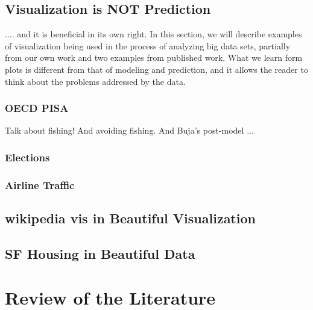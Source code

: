 \documentclass{article}
\begin{document}
\subsection{Visualization is NOT Prediction}

.... and it is beneficial in its own right. In this section, we will describe examples of visualization being used in the process of analyzing big data sets, partially from our own work and two examples from published work. What we learn form plots is different from that of modeling and prediction, and it allows the reader to think about the problems addressed by the data. 

\subsubsection{OECD PISA}

Talk about fishing! And avoiding fishing. And Buja's post-model ...

\subsubsection{Elections}

\subsubsection{Airline Traffic}

\subsection{wikipedia vis in Beautiful Visualization }

\subsection{SF Housing in Beautiful Data}

\section{Review of the Literature}
\end{document}
